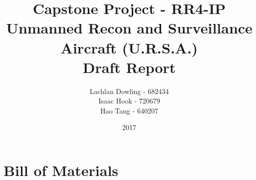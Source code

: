 \documentclass{report}
\title{Capstone Project - RR4-IP \\Unmanned Recon and Surveillance Aircraft (U.R.S.A.) \\ \Huge Draft Report}
\author{\large Lachlan Dowling - 682434 \\ Isaac Hook - 720679 \\ Hao Tang - 640207 }
\date{2017}
\begin{document}
\thispagestyle{empty}
    \maketitle
    \thispagestyle{empty}
    
    \newpage

    \clearpage
    \setcounter{page}{1}



\tableofcontents










\appendix
\appendixpage
\chapter{Bill of Materials}

% 
% 
% 
% 
% 
% 



















 
\end{document}
